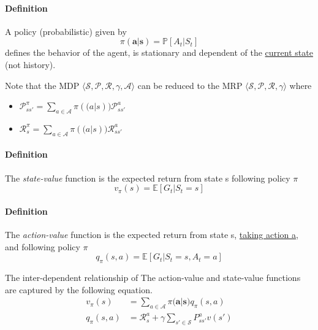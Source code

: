 \documentclass{article}
\begin{document}
	\paragraph{Definition} A policy (probabilistic) given by
	\begin{equation*}
	\pi(\mathbf{a|s}) = \mathbb{P}[A_t|S_t] 
	\end{equation*}
	defines the behavior of the agent, is stationary and dependent of the \underline{current state} (not history). 
	
	Note that the MDP $\langle \mathcal{S, P, R, \gamma, A} \rangle$ can be reduced to the MRP $ \langle \mathcal{S, P, R, \gamma} \rangle$ where
	\begin{itemize}
		\centering
		\item $\mathcal{P}^{\pi}_{ss'} = \sum_{a \in \mathcal{A}} \pi(\mathbf(a|s))\mathcal{P}^a_{ss'}$
		\item $\mathcal{R}^{\pi}_s = \sum_{a \in \mathcal{A}} \pi(\mathbf(a|s))\mathcal{R}^a_{ss'}$
	\end{itemize}
	
	
	\paragraph{Definition} The \textit{state-value} function is the expected return from state s following policy $\pi$
	\begin{equation*}
	v_\pi(s) = \mathbb{E}[G_t|S_t = s]
	\end{equation*}
	
	\paragraph{Definition} The \textit{action-value} function is the expected return from state s, \underline{taking action a}, and following policy $\pi$
	\begin{equation*}
	q_\pi(s,a) = \mathbb{E}[G_t|S_t = s, A_t = a]
	\end{equation*}
	
	The inter-dependent relationship of The action-value and state-value functions are captured by the following equation.
	\begin{align*}
	v_\pi(s) &= \sum_{a \in \mathcal{A}}  \pi(\mathbf{a|s)}q_\pi(s,a) \\
	q_\pi(s,a) &= \mathcal{R}^a_s + \gamma \sum_{s' \in \mathcal{S}} P^a_{ss'}v(s') 
	\end{align*}
	
\end{document}

